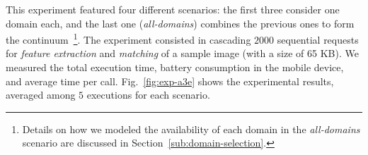 This experiment featured four different scenarios: the first three consider one domain each, and the last one (\textit{all-domains}) combines the previous ones to form the continuum~\footnote{Details on how we modeled the availability of each domain in the \textit{all-domains} scenario are discussed in Section~\ref{sub:domain-selection}.}. The experiment consisted in cascading $2000$ sequential requests for \textit{feature extraction} and \textit{matching} of a sample image (with a size of 65 KB). We measured the total execution time, battery consumption in the mobile device, and average time per call. Fig.~\ref{fig:exp-a3e} shows the experimental results, averaged among $5$ executions for each scenario.

